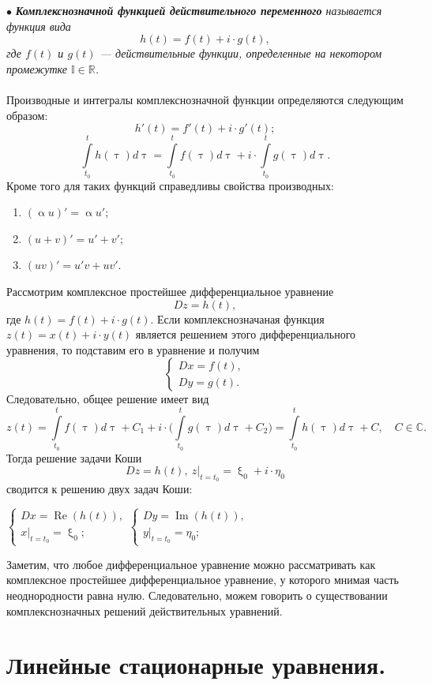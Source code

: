 \documentclass[a4paper, 12pt]{report}
\renewcommand{\alpha}{\upalpha}
\renewcommand{\xi}{\upxi}
\renewcommand{\Re}{\operatorname{Re}}
\renewcommand{\Im}{\operatorname{Im}}
\begin{document}
	$\bullet$ \textit{\textbf{Комплекснозначной функцией действительного переменного} называется функция вида $$h(t) = f(t) + i\cdot g(t),$$ где $f(t)$ и $g(t)$ --- действительные функции, определенные на некотором промежутке $\mathbb{I}\in\mathbb{R}$.}\\\\
	Производные и интегралы комплекснозначной функции определяются следующим образом: $$h'(t) = f'(t) + i\cdot g'(t);$$ $$\int\limits_{t_0}^th(\uptau)d\uptau = \int\limits_{t_0}^tf(\uptau)d\uptau + i\cdot \int\limits_{t_0}^tg(\uptau)d\uptau.$$
	Кроме того для таких функций справедливы свойства производных:\begin{enumerate}
		\item $(\alpha u)' = \alpha u'$;
		\item $(u+v)' = u' + v';$
		\item $(uv)' = u'v + uv'.$
	\end{enumerate}
	Рассмотрим комплексное простейшее дифференциальное уравнение $$Dz = h(t),$$ где $h(t) = f(t) + i\cdot g(t)$. Если комплекснозначаная функция $z(t) = x(t) + i\cdot y(t)$ является решением этого дифференциального уравнения, то подставим его в уравнение и получим 
	$$\begin{cases}Dx = f(t),\\Dy = g(t).\end{cases}$$ 
	Следовательно, общее решение имеет вид $$z(t) = \int\limits_{t_0}^tf(\uptau)d\uptau + C_1 + i\cdot \Big(\int\limits_{t_0}^tg(\uptau)d\uptau + C_2\Big) = \int\limits_{t_0}^th(\uptau)d\uptau + C,\quad C\in\mathbb{C}.$$
	Тогда решение задачи Коши $$Dz = h(t),\ z|_{t=t_0} = \xi_0 + i\cdot \eta_0$$ сводится к решению двух задач Коши:\begin{center}
		$\begin{cases}
			Dx = \Re (h(t)),\\
			x|_{t=t_0} = \xi_0;
		\end{cases}$\qquad $\begin{cases}
			Dy = \Im (h(t)),\\
			y|_{t=t_0} = \eta_0;
		\end{cases}$
	\end{center}
	Заметим, что любое дифференциальное уравнение можно рассматривать как комплексное простейшее дифференциальное уравнение, у которого мнимая часть неоднородности равна нулю. Следовательно, можем говорить о существовании комплекснозначных решений действительных уравнений.
	\chapter{Линейные стационарные уравнения.}
\end{document}
